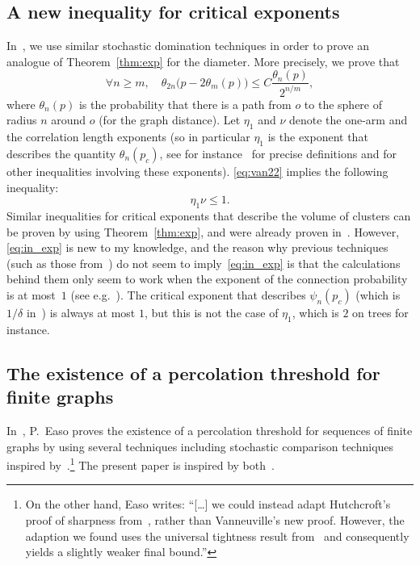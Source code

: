 \documentclass[10pt]{amsart}
\theoremstyle{definition}\newtheorem{defi}[theo]{Definition}\newtheorem{rema}[theo]{Remark}\newtheorem{exam}[theo]{Example}\newtheorem{exem}[theo]{Example}\newtheorem{nota}[theo]{Notation}
\let\oldforall\forall
\renewcommand*{\forall}{\mathrel{\oldforall}}
\begin{document}
\subsection{A new inequality for critical exponents} In~\cite{Van22}, we use similar stochastic domination techniques in order to prove an analogue of Theorem~\ref{thm:exp} for the diameter. More precisely, we prove that
\begin{equation}\label{eq:van22}
\forall n \ge m, \quad \theta_{2n}\big(p-2\theta_m(p) \big) \le C \frac{\theta_n(p)}{2^{n/m}},
\end{equation}
where $\theta_n(p)$ is the probability that there is a path from $o$ to the sphere of radius $n$ around $o$ (for the graph distance). Let $\eta_1$ and $\nu$ denote the one-arm and the correlation length exponents (so in particular $\eta_1$ is the exponent that describes the quantity $\theta_n(p_c)$, see for instance~\cite{DM21} for precise definitions and for other inequalities involving these exponents). \eqref{eq:van22} implies the following inequality:
\begin{equation}\label{eq:in_exp}
\eta_1 \nu \le 1.
\end{equation}
Similar inequalities for critical exponents that describe the volume of clusters can be proven by using Theorem~\ref{thm:exp}, and were already proven in~\cite{Hut20}. However, \eqref{eq:in_exp} is new to my knowledge, and the reason why previous techniques (such as those from~\cite{Hut20}) do not seem to imply~\eqref{eq:in_exp} is that the calculations behind them only seem to work when the exponent of the connection probability is at most~$1$ (see e.g.~\cite[Section~4.1]{Hut20}). The critical exponent that describes $\psi_n(p_c)$ (which is $1/\delta$ in~\cite{Hut20}) is always at most $1$, but this is not the case of $\eta_1$, which is $2$ on trees for instance.

\subsection{The existence of a percolation threshold for finite graphs} 

In~\cite{Eas22}, P.~Easo proves the existence of a percolation threshold for sequences of finite graphs by using several techniques including stochastic comparison techniques inspired by~\cite{Van22}.\footnote{On the other hand, Easo writes: ``[\dots] we could instead adapt Hutchcroft’s proof of sharpness from~\cite{Hut20}, rather than Vanneuville’s new proof. However, the adaption we found uses the universal tightness result from~\cite{Hut21} and consequently yields a slightly weaker final bound.''} The present paper is inspired by both~\cite{Eas22,Van22}.
\end{document}
